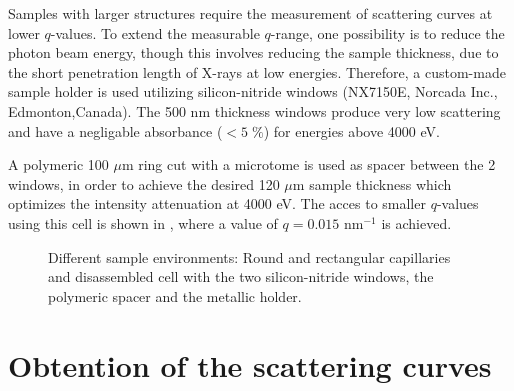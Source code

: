 Samples with larger structures require the measurement of scattering curves at lower $q$-values. To extend the measurable $q$-range, one possibility is to reduce the photon beam energy, though this involves reducing the sample thickness, due to the short penetration length of X-rays at low energies. Therefore, a custom-made sample holder is used utilizing silicon-nitride windows (NX7150E, Norcada Inc., Edmonton,Canada). The 500 nm thickness windows produce very low scattering and have a negligable absorbance ($<5\;\%$) for energies above 4000 eV.

A polymeric 100 $\mu$m ring cut with a microtome is used as spacer between the 2 windows, in order to achieve the desired 120 $\mu$m sample thickness which optimizes the intensity attenuation at 4000 eV. The acces to smaller $q$-values using this cell is shown in \cite{varga_towards_2014}, where a value of $q=0.015$ nm$^{-1}$ is achieved.

\begin{figure}%
	\centering
		\caption{Different sample environments: Round and rectangular capillaries and disassembled cell with the two silicon-nitride windows, the polymeric spacer and the metallic holder.}
		\label{fig:SampleEnvironment}
\end{figure}

\section{Obtention of the scattering curves}


